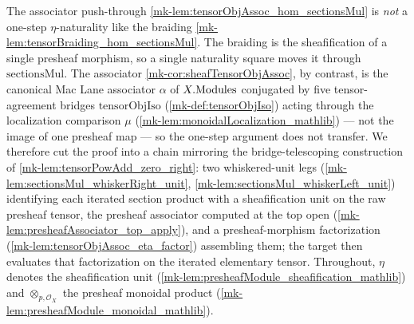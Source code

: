 The associator push-through \ref{mk-lem:tensorObjAssoc_hom_sectionsMul} is \emph{not}
a one-step \(\eta\)-naturality like the braiding
\ref{mk-lem:tensorBraiding_hom_sectionsMul}. The braiding is the sheafification of a
single presheaf morphism, so a single naturality square moves it through
\(\mathrm{sectionsMul}\). The associator \ref{mk-cor:sheafTensorObjAssoc}, by
contrast, is the canonical Mac Lane associator \(\alpha\) of \(X.\mathrm{Modules}\)
conjugated by five tensor-agreement bridges \(\mathrm{tensorObjIso}\)
(\ref{mk-def:tensorObjIso}) acting through the localization comparison \(\mu\)
(\ref{mk-lem:monoidalLocalization_mathlib}) --- not the image of one presheaf map ---
so the one-step argument does not transfer. We therefore cut the proof into a chain
mirroring the bridge-telescoping construction of
\ref{mk-lem:tensorPowAdd_zero_right}: two whiskered-unit legs
(\ref{mk-lem:sectionsMul_whiskerRight_unit},
\ref{mk-lem:sectionsMul_whiskerLeft_unit}) identifying each iterated section product
with a sheafification unit on the raw presheaf tensor, the presheaf associator
computed at the top open (\ref{mk-lem:presheafAssociator_top_apply}), and a
presheaf-morphism factorization (\ref{mk-lem:tensorObjAssoc_eta_factor}) assembling
them; the target then evaluates that factorization on the iterated elementary
tensor. Throughout, \(\eta\) denotes the sheafification unit
(\ref{mk-lem:presheafModule_sheafification_mathlib}) and \(\otimes_{p,\mathcal{O}_X}\)
the presheaf monoidal product (\ref{mk-lem:presheafModule_monoidal_mathlib}).

